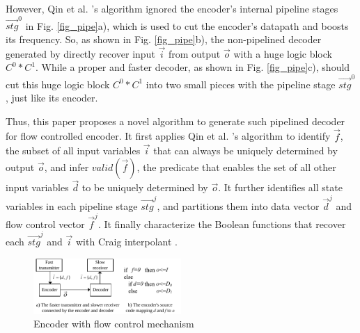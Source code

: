 \documentclass[conference]{IEEEtran}
\begin{document}
However,
Qin et al. \cite{QinTODAES15}'s algorithm ignored the encoder's 
internal pipeline stages $\vec{stg}^0$ in Fig. \ref{fig_pipe}a),
which is used to cut the encoder's datapath and boosts its frequency.
So,
as shown in Fig. \ref{fig_pipe}b),
the non-pipelined decoder generated by \cite{QinTODAES15} 
directly recover input $\vec{i}$ from output $\vec{o}$ with a huge logic block $C^0*C^1$.
While a proper and faster decoder,
as shown in Fig. \ref{fig_pipe}c),
should cut this huge logic block $C^0*C^1$ into two small pieces with the pipeline stage $\vec{stg}^0$,
just like its encoder.






Thus,
this paper proposes a novel algorithm to generate such pipelined decoder for flow controlled encoder.
It first applies Qin et al. \cite{QinTODAES15}'s algorithm 
to identify $\vec{f}$,
the subset of all input variables $\vec{i}$ that can always be uniquely determined by output $\vec{o}$,
and infer $valid(\vec{f})$,
the predicate that enables the set of all other input variables $\vec{d}$ to be uniquely determined by $\vec{o}$.
It further identifies all state variables in each pipeline stage $\vec{stg}^j$,
and partitions them into data vector $\vec{d}^j$ and flow control vector $\vec{f}^j$.
It finally characterize the Boolean functions that recover each $\vec{stg}^j$ and $\vec{i}$ with 
Craig interpolant \cite{InterpBoolFunction}.

\begin{figure}[t]
\centering
\includegraphics[width=0.5\textwidth]{nonuniq}
\caption{Encoder with flow control mechanism}
\label{fig_fc}
\end{figure}
\end{document}
